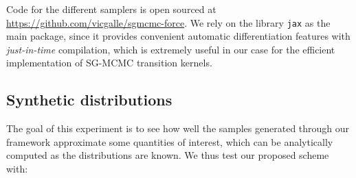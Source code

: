 Code for the different samplers is open sourced at \url{https://github.com/vicgalle/sgmcmc-force}. We rely on the library \texttt{jax} \cite{jax2018github} as the main package, since it provides convenient automatic differentiation features with \emph{just-in-time} compilation, which is extremely useful in our case for the efficient implementation of SG-MCMC transition kernels.

\subsection{Synthetic distributions} 
The goal of this experiment is to see how well the samples generated through our framework approximate some quantities of interest, which can be analytically computed as the distributions are known. We thus test our proposed scheme with:


